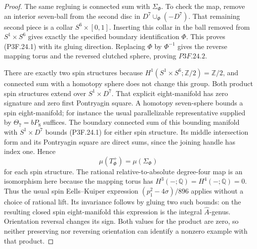 \begin{proof}
The same regluing is connected sum with \(\Sigma_\Phi\). To check the map, remove an interior seven-ball from the second disc in \(D^7\cup_\Phi(-D^7)\). That remaining second piece is a collar \(S^6\times[0,1]\). Inserting this collar in the ball removed from \(S^1\times S^6\) gives exactly the specified boundary identification \(\Phi\). This proves (P3F.24.1) with its gluing direction. Replacing \(\Phi\) by \(\Phi^{-1}\) gives the reverse mapping torus and the reversed clutched sphere, proving \(P3F.24.2\).

There are exactly two spin structures because \(H^1(S^1\times S^6;\mathbb Z/2)=\mathbb Z/2\), and connected sum with a homotopy sphere does not change this group. Both product spin structures extend over \(S^1\times D^7\). That explicit eight-manifold has zero signature and zero first Pontryagin square. A homotopy seven-sphere bounds a spin eight-manifold; for instance the usual parallelizable representative supplied by \(\Theta _7=bP_8\) suffices. The boundary connected sum of this bounding manifold with \(S^1\times D^7\) bounds (P3F.24.1) for either spin structure. Its middle intersection form and its Pontryagin square are direct sums, since the joining handle has index one. Hence \[
 \mu(T^+_\Phi)=\mu(\Sigma_\Phi)
\] for each spin structure. The rational relative-to-absolute degree-four map is an isomorphism here because the mapping torus has \(H^3(-;\mathbb Q)=H^4(-;\mathbb Q)=0\). Thus the usual spin Eells--Kuiper expression \((p_1^2-4\sigma)/896\) applies without a choice of rational lift. Its invariance follows by gluing two such bounds: on the resulting closed spin eight-manifold this expression is the integral \(\widehat A\)-genus. Orientation reversal changes its sign. Both values for the product are zero, so neither preserving nor reversing orientation can identify a nonzero example with that product.
\end{proof}
